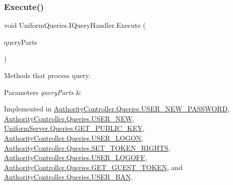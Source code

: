 \mbox{\label{interface_uniform_queries_1_1_i_query_handler_a66d15db03bdd5b0caf6eef96f9b803c0}} 
\subsubsection{\texorpdfstring{Execute()}{Execute()}}
{\footnotesize\ttfamily void Uniform\+Queries.\+I\+Query\+Handler.\+Execute (\begin{DoxyParamCaption}\item[{\mbox{\hyperlink{struct_uniform_queries_1_1_query_part}{Query\+Part}} \mbox{[}$\,$\mbox{]}}]{query\+Parts }\end{DoxyParamCaption})}



Methods that process query. 


\begin{DoxyParams}{Parameters}
{\em query\+Parts} & \\
\hline
\end{DoxyParams}


Implemented in \mbox{\hyperlink{class_authority_controller_1_1_queries_1_1_u_s_e_r___n_e_w___p_a_s_s_w_o_r_d_a63a5424c90f45f09f72a530ef0389416}{Authority\+Controller.\+Queries.\+U\+S\+E\+R\+\_\+\+N\+E\+W\+\_\+\+P\+A\+S\+S\+W\+O\+RD}}, \mbox{\hyperlink{class_authority_controller_1_1_queries_1_1_u_s_e_r___n_e_w_afd715fb3d60e53ca7e3d55a4433f529c}{Authority\+Controller.\+Queries.\+U\+S\+E\+R\+\_\+\+N\+EW}}, \mbox{\hyperlink{class_uniform_server_1_1_queries_1_1_g_e_t___p_u_b_l_i_c___k_e_y_a63367fa9543a3fb4a1126373a833c317}{Uniform\+Server.\+Queries.\+G\+E\+T\+\_\+\+P\+U\+B\+L\+I\+C\+\_\+\+K\+EY}}, \mbox{\hyperlink{class_authority_controller_1_1_queries_1_1_u_s_e_r___l_o_g_o_n_a001f81c71597259636be777078e50f7e}{Authority\+Controller.\+Queries.\+U\+S\+E\+R\+\_\+\+L\+O\+G\+ON}}, \mbox{\hyperlink{class_authority_controller_1_1_queries_1_1_s_e_t___t_o_k_e_n___r_i_g_h_t_s_aebb323c8033e3a027f59c55a95695360}{Authority\+Controller.\+Queries.\+S\+E\+T\+\_\+\+T\+O\+K\+E\+N\+\_\+\+R\+I\+G\+H\+TS}}, \mbox{\hyperlink{class_authority_controller_1_1_queries_1_1_u_s_e_r___l_o_g_o_f_f_a2e4d5a0f8ee93210522c41a38adbcce2}{Authority\+Controller.\+Queries.\+U\+S\+E\+R\+\_\+\+L\+O\+G\+O\+FF}}, \mbox{\hyperlink{class_authority_controller_1_1_queries_1_1_g_e_t___g_u_e_s_t___t_o_k_e_n_a99b0dddf4ff45771e546ec0fa14b0aae}{Authority\+Controller.\+Queries.\+G\+E\+T\+\_\+\+G\+U\+E\+S\+T\+\_\+\+T\+O\+K\+EN}}, and \mbox{\hyperlink{class_authority_controller_1_1_queries_1_1_u_s_e_r___b_a_n_a719795c950c9dedbc187c2c0cfca37a7}{Authority\+Controller.\+Queries.\+U\+S\+E\+R\+\_\+\+B\+AN}}.

